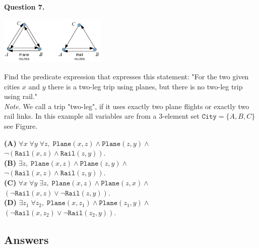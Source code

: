 \documentclass[jou]{apa6}
\begin{document}
\vspace{6pt}
{\bf Question 7.} 
\begin{center}
\includegraphics[width=2in]{relation-graphs.png}
\end{center}

Find the predicate expression that expresses this statement: 
"For the two given cities $x$ and $y$ there is a two-leg trip
using planes, but there is no two-leg trip using rail."\\
{\em Note.} We call a trip "two-leg", if it uses exactly two plane flights
or exactly two rail links. 
In this example all variables are from a 3-element set $\mathtt{City} = \{A,B,C\}$ 
\textendash{} see Figure. 


\noindent
{\bf (A)} $\forall x\;\forall y\; \forall z,\; \mathtt{Plane}(x,z) \wedge \mathtt{Plane}(z,y) \wedge$\\
$\neg \left( \mathtt{Rail}(x,z) \wedge \mathtt{Rail}(z,y) \right)$.\\[3pt]
{\bf (B)} $\exists z,\; \mathtt{Plane}(x,z) \wedge \mathtt{Plane}(z,y) \wedge$\\
$\neg \left(\mathtt{Rail}(x,z) \wedge \mathtt{Rail}(z,y)\right)$.\\[3pt]
{\bf (C)} $\forall x\; \forall y\; \exists z,\; \mathtt{Plane}(x,z) \wedge \mathtt{Plane}(z,x) \wedge$\\
$(\neg \mathtt{Rail}(x,z) \vee \neg \mathtt{Rail}(z,y))$.\\[3pt]
{\bf (D)} $\exists z_1\; \forall z_2,\; \mathtt{Plane}(x,z_1) \wedge \mathtt{Plane}(z_1,y) \wedge$\\
$(\neg \mathtt{Rail}(x,z_2) \vee \neg \mathtt{Rail}(z_2,y))$.





\subsection{Answers}
\end{document}
